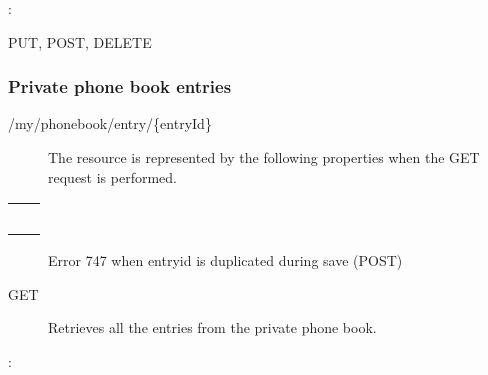 \documentclass[letterpaper,10pt,english]{sphinxmanual}
\begin{document}
:

\begin{sphinxVerbatim}[commandchars=\\\{\}]
\end{sphinxVerbatim}

 PUT, POST, DELETE


\subsubsection{Private phone book entries}
\label{\detokenize{restapi:private-phone-book-entries}}
 /my/phonebook/entry/\{entryId\}
\begin{description}
\item[{}] \leavevmode
The resource is represented by the following properties when the GET request is performed.

\end{description}


\begin{savenotes}\sphinxattablestart
\centering
\begin{tabulary}{\linewidth}[t]{|T|T|}
\hline

&
\\
\hline
{}
&\\
\hline
{}
&\\
\hline
{}
&\\
\hline
{}
&\\
\hline
{}
&\\
\hline
\end{tabulary}
\par
\sphinxattableend\end{savenotes}
\begin{description}
\item[{}] \leavevmode
Error 747 when entryid is duplicated during save (POST)

\item[{ GET}] \leavevmode
Retrieves all the entries from the private phone book.

\end{description}

:
\end{document}
